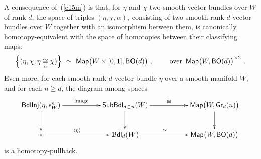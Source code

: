 A consequence of~(\ref{e15m}) is that, for $\eta$ and $\chi$ two smooth vector bundles over $W$ of rank $d$, the space of triples $(\eta , \chi , \alpha)$, consisting of two smooth rank $d$ vector bundles over $W$ together with an isomorphism between them, is canonically homotopy-equivalent with the space of homotopies between their classifying maps:
\[
\Bigl\{
(\eta , \chi , \eta \underset{\alpha}\cong \chi )
\Bigr\}
~\simeq~
\operatorname{{\sf Map}}
\bigl(
W\times [0,1] , {\sf BO}(d) 
\bigr)
~,\qquad
\text{ over }
\operatorname{{\sf Map}}\bigl(
W
,
{\sf BO}(d) 
\bigr)^{\times 2}
~.
\]
Even more, for each smooth rank $d$ vector bundle $\eta$ over a smooth manifold $W$, and for each $n \geq d$, the diagram among spaces
\begin{equation}
\label{e16m}
\xymatrix{
{\sf BdlInj}(\eta , \epsilon^n_W)
\ar[d]
\ar[rr]^-{\rm image}
&&
{\sf SubBdl}_{d \subset n}(W)
\ar[rr]^-{\cong}
\ar[d]
&&
\Map\bigl(
W
,
{\sf Gr}_d(n)
\bigr)
\ar[d]
\\
\ast
\ar[rr]^-{\lag \eta\rag}
&&
\cB{\sf dl}_d(W)
\ar[rr]^-{\cong}
&&
\Map\bigl(
W , {\sf BO}(d)
\bigr)
}
\end{equation}
is a homotopy-pullback.



















\bigskip



